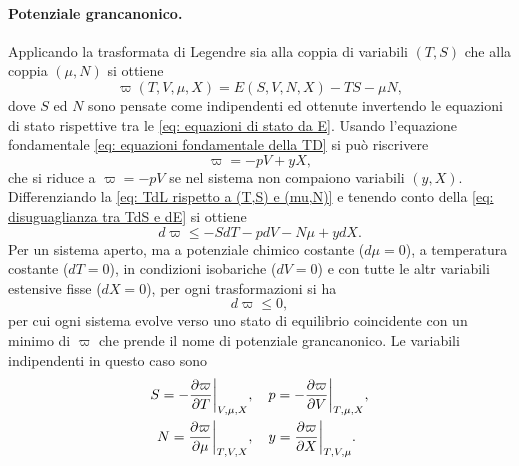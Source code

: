 \paragraph{Potenziale grancanonico.} Applicando la trasformata di Legendre sia alla coppia di variabili $(T,S)$ che alla coppia $(\mu,N)$ si ottiene
\begin{equation}
\label{eq: TdL rispetto a (T,S) e (mu,N)}
    \varpi(T,V,\mu,X) = E(S,V,N,X) - TS - \mu N,
\end{equation}
dove $S$ ed $N$ sono pensate come indipendenti ed ottenute invertendo le equazioni di stato rispettive tra le \eqref{eq: equazioni di stato da E}. Usando l'equazione fondamentale \eqref{eq: equazioni fondamentale della TD} si può riscrivere 
\begin{equation}
\label{eq: espressione del pot. grancanonico}
    \varpi = -pV + yX,
\end{equation}
che si riduce a $\varpi =  -pV$ se nel sistema non compaiono variabili $(y,X)$. Differenziando la \eqref{eq: TdL rispetto a (T,S) e (mu,N)} e tenendo conto della \eqref{eq: disuguaglianza tra TdS e dE} si ottiene
\begin{equation}
    d\varpi \le -SdT -pdV - N\mu +ydX.
\end{equation}
Per un sistema aperto, ma a potenziale chimico costante ($d\mu = 0$), a temperatura costante ($dT = 0$), in condizioni isobariche ($dV = 0$) e con tutte le altr variabili estensive fisse ($dX = 0$), per ogni trasformazioni si ha
\begin{equation}
    d\varpi \le 0,
\end{equation}
per cui ogni sistema evolve verso uno stato di equilibrio coincidente con un minimo di $\varpi$ che prende il nome di potenziale grancanonico. Le variabili indipendenti in questo caso sono
\begin{equation}
\label{eq: equazioni di stato dapot. grancanonico}
    \begin{split}
        S = -\frac{\partial \varpi}{\partial T}\bigg|_{V,\mu,X}&,\quad p = -\frac{\partial \varpi}{\partial V}\bigg|_{T,\mu,X}, \\
        N = \frac{\partial \varpi}{\partial \mu}\bigg|_{T,V,X}&,\quad y = \frac{\partial \varpi}{\partial X}\bigg|_{T,V,\mu}.
    \end{split}
\end{equation}

